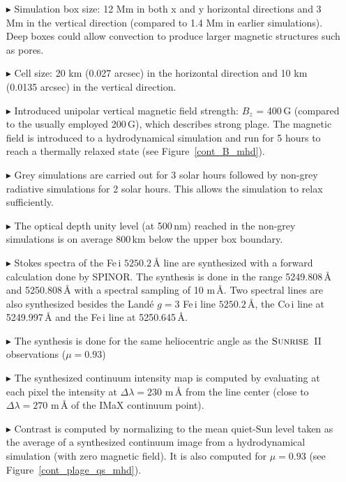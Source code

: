 \documentclass[goettingen, gauss, print]{thesis}
\begin{document}
\begin{itemize}
\item[$\blacktriangleright$] Simulation box size: 12 Mm in both x and y horizontal directions and 3 Mm in the vertical direction (compared to 1.4 Mm in earlier simulations). Deep boxes could allow convection to produce larger magnetic structures such as pores.
\item[$\blacktriangleright$] Cell size: 20 km (0.027 arcsec) in the horizontal direction and 10 km (0.0135 arcsec) in the vertical direction.


\item[$\blacktriangleright$] Introduced unipolar vertical magnetic field strength: $B_z$ = 400\,G (compared to the usually employed 200\,G), which describes strong plage. The magnetic field is introduced to a hydrodynamical simulation and run for 5 hours to reach a thermally relaxed state (see Figure~\ref{cont_B_mhd}).

\item[$\blacktriangleright$] Grey simulations are carried out for 3 solar hours followed by non-grey radiative simulations for 2 solar hours. This allows the simulation to relax sufficiently. 

\item[$\blacktriangleright$] The optical depth unity level (at 500\,nm) reached in the non-grey simulations is on average 800\,km below the upper box boundary.

\item[$\blacktriangleright$] Stokes spectra of the Fe\,{\sc i} $5250.2$\,\AA{} line are synthesized with a forward calculation done by SPINOR. The synthesis is done in the range 5249.808\,\AA{} and 5250.808\,\AA{} with a spectral sampling of 10 m\,\AA{}. Two spectral lines are also synthesized besides the Land\'e $g=3$ Fe\,{\sc i} line $5250.2$\,\AA{}, the Co\,{\sc i} line at 5249.997\,\AA{} and the Fe\,{\sc i} line at 5250.645\,\AA{}.

\item[$\blacktriangleright$] The synthesis is done for the same heliocentric angle as the $\textsc{Sunrise}$~II observations ($\mu = 0.93$)

\item[$\blacktriangleright$] The synthesized continuum intensity map is computed by evaluating at each pixel the intensity at $\Delta \lambda=230$ m\,\AA{}  from the line center (close to $\Delta \lambda=270$ m\,\AA{} of the IMaX continuum point).

\item[$\blacktriangleright$] Contrast is computed by normalizing to the mean quiet-Sun level taken as the average of a synthesized continuum image from a hydrodynamical simulation (with zero magnetic field). It is also computed for $\mu = 0.93$ (see Figure~\ref{cont_plage_qs_mhd}).

\end{itemize} 
\end{document}
